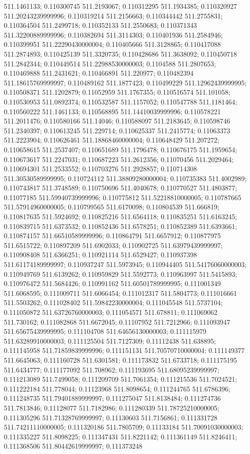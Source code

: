 511.1461133; 0.110300745 511.2193067; 0.110312295 511.1934385; 0.110320927 511.20243239999996; 0.110319214 511.2156663; 0.110344442 511.2755831; 0.110364504 511.2499718; 0.110352133 511.2550683; 0.110371343 511.32200889999996; 0.110382694 511.3114303; 0.110401936 511.2584946; 0.110399951 511.22290430000004; 0.110405666 511.3128865; 0.110417088 511.2874893; 0.110425139 511.3320735; 0.110428686 511.3638092; 0.110450718 511.2842344; 0.110449514 511.22988530000003; 0.1104588 511.2807653; 0.110469888 511.2431621; 0.110466891 511.220977; 0.110482394 511.18615769999997; 0.110489162 511.1877423; 0.110499229 511.12962439999995; 0.110508371 511.1202879; 0.11052959 511.1767355; 0.110516574 511.101058; 0.110530953 511.0892374; 0.110532587 511.1157052; 0.110547788 511.1181464; 0.110560222 511.1461133; 0.110568895 511.14410039999996; 0.110578221 511.2011476; 0.110580166 511.14046; 0.110588097 511.2183645; 0.110598746 511.2340397; 0.110613245 511.229714; 0.110625337 511.2415774; 0.11063373 511.2223904; 0.110626461 511.18868460000004; 0.110648429 511.207272; 0.110658615 511.2537407; 0.110651689 511.1796478; 0.110676175 511.1959654; 0.110673617 511.2247031; 0.110687223 511.2612356; 0.11070456 511.2029464; 0.110694301 511.2533552; 0.110703276 511.2928857; 0.110714308 511.30530589999995; 0.110724112 511.38809280000004; 0.110735383 511.4002989; 0.110743817 511.3748589; 0.110750696 511.4040678; 0.110770527 511.4803877; 0.11077185 511.59940739999996; 0.110775812 511.52218810000005; 0.110787665 511.57914960000005; 0.110799565 511.6170098; 0.110804539 511.666819; 0.110817635 511.5924692; 0.110825216 511.6564118; 0.110835251 511.6163245; 0.110839715 511.6373532; 0.110852436 511.6578251; 0.110852389 511.6393661; 0.110874157 511.66510589999996; 0.110864791 511.6657912; 0.110877975 511.6515722; 0.110897209 511.6902033; 0.110902725 511.63979439999997; 0.110908408 511.6366251; 0.110921114 511.6529427; 0.110937398 511.61174189999997; 0.110937247 511.5973945; 0.110944405 511.54176060000003; 0.110949769 511.6139262; 0.110959829 511.5592773; 0.110963997 511.5415893; 0.110976472 511.5684426; 0.110991162 511.60501789999995; 0.111001349 511.6068595; 0.111009711 511.6066454; 0.111012317 511.5804773; 0.111016661 511.5503262; 0.111028402 511.59842230000004; 0.111045548 511.5737104; 0.111050872 511.63726760000003; 0.111054571 511.678811; 0.111069062 511.730162; 0.111082868 511.6672045; 0.11107952 511.7212966; 0.111093947 511.65675439999995; 0.111104708 511.64656130000003; 0.111115979 511.63289910000003; 0.111125504 511.7127309; 0.11112438 511.638895; 0.111145958 511.71859839999996; 0.111151131 511.70570710000004; 0.111149377 511.6645063; 0.111160728 511.6301581; 0.111173832 511.6733718; 0.111175195 511.6434777; 0.111177092 511.708962; 0.111193695 511.68095239999997; 0.111213089 511.7499058; 0.111209709 511.7061354; 0.111215536 511.7024521; 0.111222184 511.778044; 0.11123968 511.8098654; 0.111244765 511.6786396; 0.111248735 511.79401889999997; 0.111275047 511.8138484; 0.111274736 511.7813846; 0.11128077 511.7182986; 0.111280339 511.78725210000005; 0.111305296 511.71328769999997; 0.11130603 511.7156861; 0.111331728 511.74211110000005; 0.111320186 511.7805709; 0.11133184 511.70091030000003; 0.111335227 511.8098225; 0.111347431 511.8221142; 0.111361149 511.8246411; 0.111368506 511.80442619999997; 0.111373248 